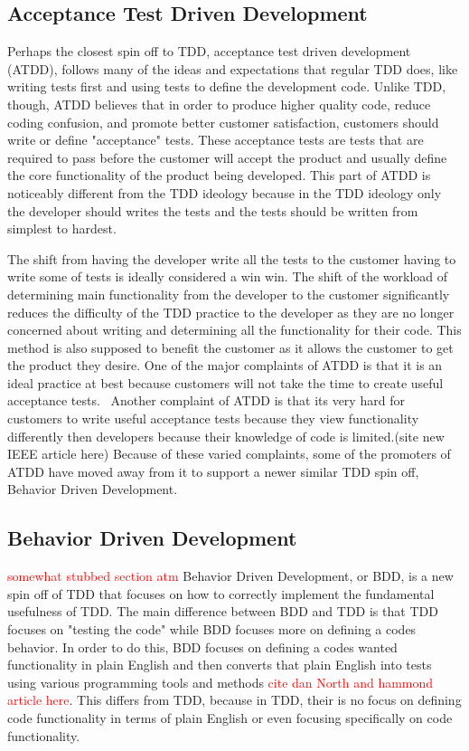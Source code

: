 \documentclass{sig-alternate}
\newcommand{\mycomment}[1]{\textcolor{red}{#1}}
\begin{document}
\subsection{Acceptance Test Driven Development}

Perhaps the closest spin off to TDD, acceptance test driven development (ATDD), follows many of the ideas and expectations that regular TDD does, like writing tests first and using tests to define the development code.  Unlike TDD, though, ATDD believes that in order to produce higher quality code, reduce coding confusion, and promote better customer satisfaction, customers should write or define "acceptance" tests.  These acceptance tests are tests that are required to pass before the customer will accept the product and usually define the core functionality of the product being developed.  This part of ATDD is noticeably different from the TDD ideology because in the TDD ideology only the developer should writes the tests and the tests should be written from simplest to hardest.~\cite{Hammond:2012}

The shift from having the developer write all the tests to the customer having to write some of tests is ideally considered a win win.  The shift of the workload of determining main functionality from the developer to the customer significantly reduces the difficulty of the TDD practice to the developer as they are no longer concerned about writing and determining all the functionality for their code.  This method is also supposed to benefit the customer as it allows the customer to get the product they desire.  One of the major complaints of ATDD is that it is an ideal practice at best because customers will not take the time to create useful acceptance tests.~\cite{Hammond:2012} Another complaint of ATDD is that its very hard for  customers to write useful acceptance tests  because they view functionality differently then developers because their knowledge of code is limited.(site new IEEE article here)  Because of these varied complaints, some of the promoters of ATDD have moved away from it to support a newer similar TDD spin off, Behavior Driven Development.

\subsection{Behavior Driven Development}
\mycomment{somewhat stubbed section atm}
Behavior Driven Development, or BDD, is a new spin off of TDD that focuses on how to correctly implement the fundamental usefulness of TDD.  The main difference between BDD and TDD is that TDD focuses on "testing the code" while BDD focuses more on defining a codes behavior. 
In order to do this, BDD focuses on defining a codes wanted functionality in plain English and then converts that plain English into tests using various programming tools and methods \mycomment{cite dan North and hammond article here}. This differs from TDD, because in TDD, their is no focus on defining code functionality in terms of plain English or even focusing specifically on code functionality.
\end{document}
